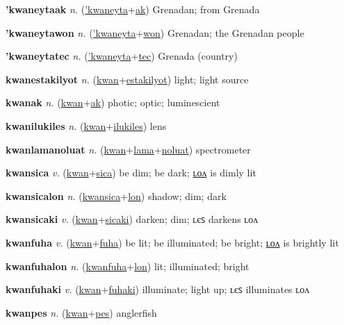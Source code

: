 \textbf{\hypertarget{'kwaneytaak}{'kwaneytaak}} \textit{n.} (\hyperlink{'kwaneyta}{'kwaneyta}+\allowbreak \hyperlink{ak}{ak})
Grenadan; from Grenada

\textbf{\hypertarget{'kwaneytawon}{'kwaneytawon}} \textit{n.} (\hyperlink{'kwaneyta}{'kwaneyta}+\allowbreak \hyperlink{won}{won})
Grenadan; the Grenadan people

\textbf{\hypertarget{'kwaneytatec}{'kwaneytatec}} \textit{n.} (\hyperlink{'kwaneyta}{'kwaneyta}+\allowbreak \hyperlink{tec}{tec})
Grenada (country)

\textbf{\hypertarget{kwanestakilyot}{kwanestakilyot}} \textit{n.} (\hyperlink{kwan}{kwan}+\allowbreak \hyperlink{estakilyot}{estakilyot})
light; light source

\textbf{\hypertarget{kwanak}{kwanak}} \textit{n.} (\hyperlink{kwan}{kwan}+\allowbreak \hyperlink{ak}{ak})
photic; optic; luminescient

\textbf{\hypertarget{kwanilukiles}{kwanilukiles}} \textit{n.} (\hyperlink{kwan}{kwan}+\allowbreak \hyperlink{ilukiles}{ilukiles})
lens

\textbf{\hypertarget{kwanlamanoluat}{kwanlamanoluat}} \textit{n.} (\hyperlink{kwan}{kwan}+\allowbreak \hyperlink{lama}{lama}+\allowbreak \hyperlink{noluat}{noluat})
spectrometer

\textbf{\hypertarget{kwansica}{kwansica}} \textit{v.} (\hyperlink{kwan}{kwan}+\allowbreak \hyperlink{sica}{sica})
be dim; be dark; \hyperlink{kwansicalon}{ʟᴏᴧ} is dimly lit

\textbf{\hypertarget{kwansicalon}{kwansicalon}} \textit{n.} (\hyperlink{kwansica}{kwansica}+\allowbreak \hyperlink{lon}{lon})
shadow; dim; dark

\textbf{\hypertarget{kwansicaki}{kwansicaki}} \textit{v.} (\hyperlink{kwan}{kwan}+\allowbreak \hyperlink{sicaki}{sicaki})
darken; dim; ʟєꜱ darkens ʟᴏᴧ

\textbf{\hypertarget{kwanfuha}{kwanfuha}} \textit{v.} (\hyperlink{kwan}{kwan}+\allowbreak \hyperlink{fuha}{fuha})
be lit; be illuminated; be bright; \hyperlink{kwanfuhalon}{ʟᴏᴧ} is brightly lit

\textbf{\hypertarget{kwanfuhalon}{kwanfuhalon}} \textit{n.} (\hyperlink{kwanfuha}{kwanfuha}+\allowbreak \hyperlink{lon}{lon})
lit; illuminated; bright

\textbf{\hypertarget{kwanfuhaki}{kwanfuhaki}} \textit{v.} (\hyperlink{kwan}{kwan}+\allowbreak \hyperlink{fuhaki}{fuhaki})
illuminate; light up; ʟєꜱ illuminates ʟᴏᴧ

\textbf{\hypertarget{kwanpes}{kwanpes}} \textit{n.} (\hyperlink{kwan}{kwan}+\allowbreak \hyperlink{pes}{pes})
anglerfish

